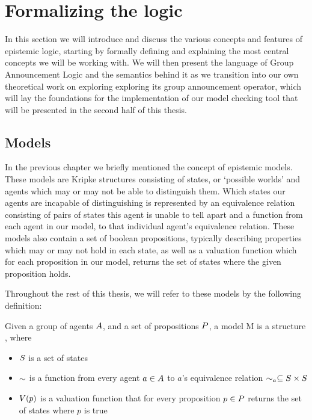 \section{Formalizing the logic}\label{sec:theory}

In this section we will introduce and discuss the various concepts and features of epistemic logic, starting by formally defining and explaining the most central concepts we will be working with. We will then present the language of Group Announcement Logic and the semantics behind it as we transition into our own theoretical work on exploring exploring its group announcement operator, which will lay the foundations for the implementation of our model checking tool that will be presented in the second half of this thesis.


\subsection{Models}

In the previous chapter we briefly mentioned the concept of epistemic models. These models are Kripke structures consisting of states, or `possible worlds' and agents which may or may not be able to distinguish them. Which states our agents are incapable of distinguishing is represented by an equivalence relation consisting of pairs of states this agent is unable to tell apart and a function from each agent in our model, to that individual agent's equivalence relation. These models also contain a set of boolean propositions, typically describing properties which may or may not hold in each state, as well as a valuation function which for each proposition in our model, returns the set of states where the given proposition holds.

Throughout the rest of this thesis, we will refer to these models by the following definition: 

\begin{definition}[Models]\label{def:model}
	Given a group of agents $A$, and a set of propositions $P$, a model M is a structure \model{} , where
	\begin{itemize}
		\item $S$ is a set of states
		\item $\sim$ is a function from every agent $a \in A$ to $a$'s equivalence relation $\sim_a \subseteq S\times S$
		\item $V(p)$ is a valuation function that for every proposition $p \in P$ returns the set of states where $p$ is true
	\end{itemize}
\end{definition}

